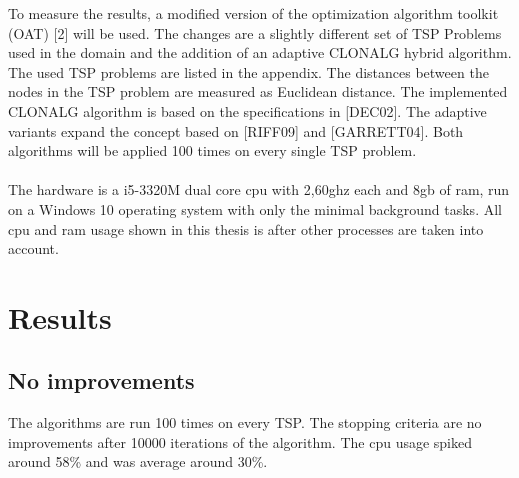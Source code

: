 To measure the results, a modified version of the optimization algorithm toolkit (OAT) [2] will be used. The changes are a slightly different set of TSP Problems used in the domain and the addition of an adaptive CLONALG hybrid algorithm. The used TSP problems are listed in the appendix. The distances between the nodes in the TSP problem are measured as Euclidean distance. The implemented CLONALG algorithm is based on the specifications in [DEC02]. The adaptive variants expand the concept based on [RIFF09] and [GARRETT04].
Both algorithms will be applied 100 times on every single TSP problem.\\\\
The hardware is a i5-3320M dual core cpu with 2,60ghz each and 8gb of ram, run on a Windows 10 operating system with only the minimal background tasks. All cpu and ram usage shown in this thesis is after other processes are taken into account.
\section{Results}
\subsection{No improvements}
The algorithms are run 100 times on every TSP. The stopping criteria are no improvements after 10000 iterations of the algorithm. The cpu usage spiked around 58\% and was average around 30\%. 